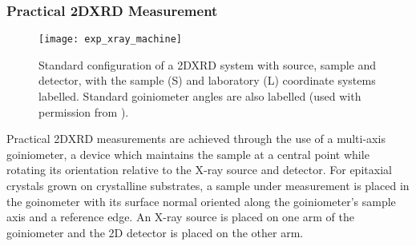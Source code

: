 \subsubsection{Practical 2DXRD Measurement}
\begin{figure}
 \centering \texttt{[image: exp\_xray\_machine]}
 \caption[Typical 2DXRD experimental implementation]{\label{fig:exp_xray_machine}Standard configuration of a 2DXRD system with source, sample and detector, with the sample (S) and laboratory (L) coordinate systems labelled. Standard goiniometer angles are also labelled (used with permission from \cite{He2009}).}
\end{figure}
Practical 2DXRD measurements are achieved through the use of a multi-axis goiniometer, a device which maintains the sample at a central point while rotating its orientation relative to the X-ray source and detector.
For epitaxial crystals grown on crystalline substrates, a sample under measurement is placed in the goinometer with its surface normal oriented along the goiniometer's sample axis and a reference edge.
An X-ray source is placed on one arm of the goiniometer and the 2D detector is placed on the other arm.

